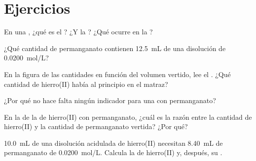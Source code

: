 \section{Ejercicios}


\begin{exercise}[$\star$]\label{exo:g11:titration:1}
En una , ¿qué es el ? ¿Y la ?
¿Qué ocurre en la ?
\end{exercise}

\begin{exercise}[$\star$]\label{exo:g11:titration:2}
¿Qué cantidad de  permanganato contienen \qty{12.5}{mL} de una
disolución de \qty{0.0200}{mol/L}?
\end{exercise}

\begin{exercise}[$\star$]\label{exo:g11:titration:3}
En la figura de las cantidades en función del volumen vertido, lee el
. ¿Qué cantidad de hierro(II) había al principio
en el matraz?
\end{exercise}

\begin{exercise}[$\star$]\label{exo:g11:titration:4}
¿Por qué no hace falta ningún indicador para una  con
permanganato?
\end{exercise}

\begin{exercise}[$\star$]\label{exo:g11:titration:5}
En la  de la  de hierro(II) con permanganato,
¿cuál es la razón entre la cantidad de hierro(II) y la cantidad de
permanganato vertida? ¿Por qué?
\end{exercise}

\begin{exercise}[$\star\star$]\label{exo:g11:titration:6}
\qty{10.0}{mL} de una disolución acidulada de hierro(II) necesitan
\qty{8.40}{mL} de permanganato de \qty{0.0200}{mol/L}. Calcula la
 de hierro(II) y, después, su .
\end{exercise}

